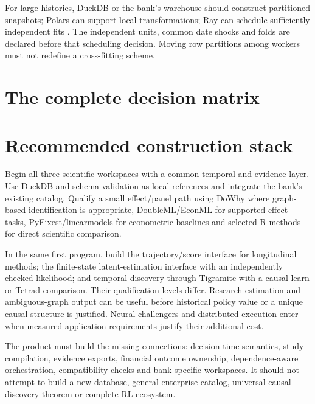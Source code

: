 For large histories, DuckDB or the bank's warehouse should construct
partitioned snapshots; Polars can support local transformations; Ray can
schedule sufficiently independent fits \citep{sw_duckdb,sw_polars,sw_ray}.
The independent units, common date shocks and folds are declared before
that scheduling decision. Moving row partitions among workers must not
redefine a cross-fitting scheme.

\section{The complete decision matrix}
\small

\normalsize

\section{Recommended construction stack}
Begin all three scientific workspaces with a common temporal and evidence
layer. Use DuckDB and schema validation as local references and integrate
the bank's existing catalog. Qualify a small effect/panel path using
DoWhy where graph-based identification is appropriate,
DoubleML/EconML for supported effect tasks, PyFixest/linearmodels for
econometric baselines and selected R methods for direct scientific
comparison.

In the same first program, build the trajectory/score interface for
longitudinal methods; the finite-state latent-estimation interface with
an independently checked likelihood; and temporal discovery through
Tigramite with a causal-learn or Tetrad comparison. Their qualification
levels differ. Research estimation and ambiguous-graph output can be useful
before historical policy value or a unique causal structure is justified.
Neural challengers and distributed execution enter when measured application
requirements justify their additional cost.

The product must build the missing connections: decision-time semantics,
study compilation, evidence exports, financial outcome ownership,
dependence-aware orchestration, compatibility checks and bank-specific
workspaces. It should not attempt to build a new database, general enterprise
catalog, universal causal discovery theorem or complete RL ecosystem.
